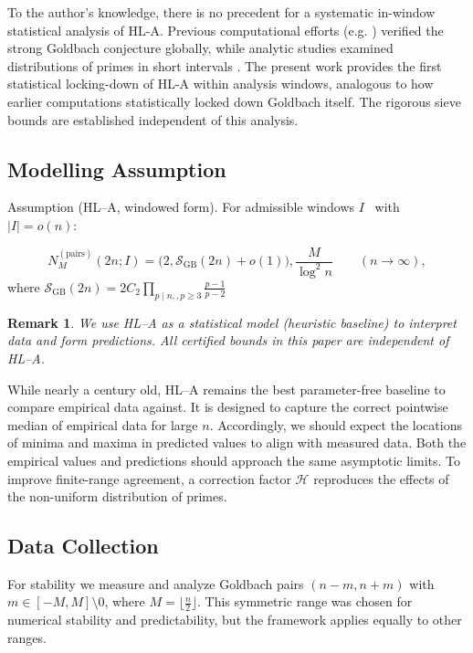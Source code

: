 \documentclass[11pt]{article}
\theoremstyle{inline}
\newtheorem*{remark}{Remark}
\theoremstyle{break}
\theoremstyle{break}
\theoremstyle{break}
\theoremstyle{break}
\theoremstyle{break}
\theoremstyle{break}
\theoremstyle{break}
\theoremstyle{inline}
\newcommand{\SGB}{\mathcal{S}_{\scriptscriptstyle\mathrm{GB}}}
\newcommand{\HLCorr}{\mathcal{H}}
\begin{document}
To the author’s knowledge, there is no precedent for a systematic in-window statistical analysis of HL-A. Previous computational efforts (e.g. \cite{OliveiraESilva2014}) verified the strong Goldbach conjecture globally, while analytic studies examined distributions of primes in short intervals \cite{MontgomerySoundararajan2004,GranvilleSoundararajan2007}. The present work provides the first statistical locking-down of HL-A within analysis windows, analogous to how earlier computations statistically locked down Goldbach itself.  The rigorous sieve bounds are established independent of this analysis.

\subsection*{Modelling Assumption}
Assumption (HL–A, windowed form). For admissible windows \( I \)  with \( \lvert I \rvert = o(n) \):

\begin{equation}
N_M^{(\mathrm{pairs})}(2n;I)  = \Big(2,\SGB(2n) + o(1)\Big),\frac{M}{\log^2 n}
\qquad(n\to\infty),
\end{equation}
where \( \SGB(2n) = 2C_2\prod_{p\mid n,,p\ge3} \frac{p-1}{p-2} \)

\begin{remark}
We use HL–A as a statistical model (heuristic baseline) to interpret data and form predictions. All certified bounds in this paper are independent of HL–A.
\end{remark}

While nearly a century old, HL–A remains the best parameter-free baseline to compare empirical data against. It is designed to capture the correct pointwise median of empirical data for large \( n \). Accordingly, we should expect the locations of minima and maxima in predicted values to align with measured data. Both the empirical values and predictions should approach the same asymptotic limits. To improve finite-range agreement, a correction factor \( \HLCorr \) reproduces the effects of the non-uniform distribution of primes.


\subsection*{Data Collection}

For stability we measure and analyze Goldbach pairs \( (n-m, n+m) \) with \( m \in [-M,M] \setminus{0} \), where \( M=\lfloor \frac{n}{2} \rfloor \). This symmetric range was chosen for numerical stability and predictability, but the framework applies equally to other ranges.
\end{document}
